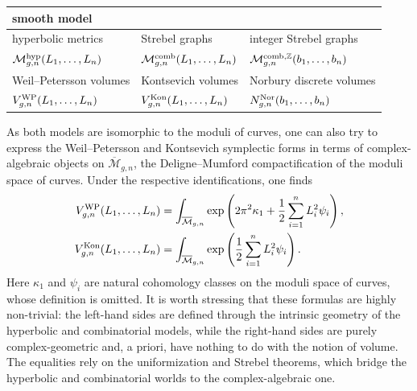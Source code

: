\documentclass[a4paper,11pt,english]{article}
\theoremstyle{plain}
\theoremstyle{definition}
\theoremstyle{plain}
\newcommand{\Z}{\mathbb{Z}}
\newcommand{\M}{\mathcal{M}}
\newcommand{\Mbar}{\overline{\mathcal{M}}}
\begin{document}
\begin{center}
    \renewcommand{\arraystretch}{1.2}
    \begin{tabular}{>{\centering\arraybackslash}p{}|>{\centering\arraybackslash}p{}|>{\centering\arraybackslash}p{}}
        \toprule
        smooth model & \multicolumn{2}{c}{combinatorial model} \\
        \midrule
        hyperbolic metrics &
        Strebel graphs &
        integer Strebel graphs \\
        $\M_{g,n}^{\textup{hyp}}(L_1,\ldots,L_n)$ &
        $\M_{g,n}^{\textup{comb}}(L_1,\ldots,L_n)$ &
        $\M_{g,n}^{\textup{comb},\Z}(b_1,\ldots,b_n)$ \\
        \midrule
        Weil--Petersson volumes &
        Kontsevich volumes &
        Norbury discrete volumes \\
        $V^{\textup{WP}}_{g,n}(L_1,\ldots,L_n)$ &
        $V^{\textup{Kon}}_{g,n}(L_1,\ldots,L_n)$ &
        $N^{\textup{Nor}}_{g,n}(b_1,\ldots,b_n)$ \\
        \bottomrule
    \end{tabular}
\end{center}

As both models are isomorphic to the moduli of curves, one can also try to express the Weil--Petersson and Kontsevich symplectic forms in terms of complex-algebraic objects on $\Mbar_{g,n}$, the Deligne--Mumford compactification of the moduli space of curves. Under the respective identifications, one finds \cite{Wol85,Mir07b,Kon92}
\begin{equation}\label{eq:vol:kappa:psi}
\begin{aligned}
    V^{\textup{WP}}_{g,n}(L_1,\ldots,L_n)
    &=
    \int_{\Mbar_{g,n}}
        \exp\left(
            2 \pi^2 \kappa_1
            +
            \frac{1}{2} \sum_{i=1}^n L_i^2 \psi_i
        \right),
    \\
    V^{\textup{Kon}}_{g,n}(L_1,\ldots,L_n)
    &=
    \int_{\Mbar_{g,n}}
        \exp\left(
            \frac{1}{2} \sum_{i=1}^n L_i^2 \psi_i
        \right).
\end{aligned}
\end{equation}
Here $\kappa_1$ and $\psi_i$ are natural cohomology classes on the moduli space of curves, whose definition is omitted. It is worth stressing that these formulas are highly non-trivial: the left-hand sides are defined through the intrinsic geometry of the hyperbolic and combinatorial models, while the right-hand sides are purely complex-geometric and, a priori, have nothing to do with the notion of volume. The equalities rely on the uniformization and Strebel theorems, which bridge the hyperbolic and combinatorial worlds to the complex-algebraic one.
\end{document}
